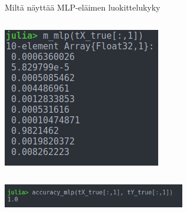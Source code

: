 \documentclass[presentation]{beamer}
\begin{document}
\begin{frame}{Miltä näyttää MLP-eläimen luokittelukyky}
\begin{columns}[]
		    \centering
				\includegraphics[width=\textwidth]{mnist_mlp_prediction.png}

	\end{columns}
	\pause
	\centering
	\includegraphics[width=0.6\textwidth]{accuracy.png}

\end{frame}
\end{document}

